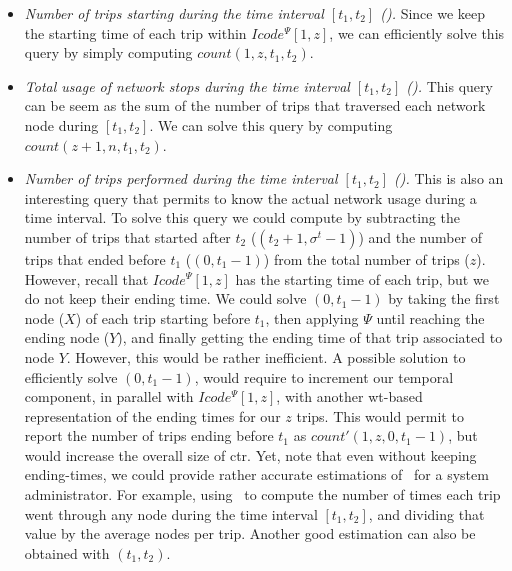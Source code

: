 	\begin{itemize}[leftmargin=3mm]
	\setlength{\itemindent}{0mm}


	\item {\em Number of trips starting during the time interval $[t_1,t_2]$ (\Tst).} Since we keep the
	starting time of each trip within $Icode^{\Psi}[1,z]$, we can efficiently solve this query 
	by simply computing $count(1,z,t_1,t_2)$.

	\item  {\em Total usage of network stops during the time interval $[t_1,t_2]$ (\Tut).} This query
	can be seem as the sum of the number of trips that traversed each network node during $[t_1,t_2]$.
	We can solve this query by computing $count(z+1,n,t_1,t_2)$. 

	\item {\em Number of trips performed during the time interval $[t_1,t_2]$ (\Ttt).} This is also an
	interesting query that permits to know the actual network usage during a time interval. 
	To solve this query
	we could compute {\em \Ttt} by subtracting the number of trips that started after $t_2$ 
	(\textit{\Tst}$(t_2+1,\sigma^t-1) $) and the number of trips that ended 
	before $t_1$ (\textit{\Tet}$(0,t_1-1) $) from the total number of trips ($z$). 
	However, recall that
	$Icode^{\Psi}[1,z]$ has the starting time of each trip, but we do not keep their ending time.
	We could solve \textit{\Tet}$(0,t_1-1)$ by taking the first node ($X$) of each trip starting
	before $t_1$, then applying $\Psi$ until reaching the ending node ($Y$), and finally getting the ending
	time of that trip associated to node $Y$. However, this would be rather inefficient.
	A possible solution to efficiently solve \textit{\Tet}$(0,t_1-1)$, would require to increment our temporal
	component, in parallel with $Icode^{\Psi}[1,z]$,  with another \gls{wt}-based representation of the 
	ending times for our $z$ trips. This would permit to report the number of trips
	ending before $t_1$ as $count'(1,z,0,t_1-1)$, but would increase the overall size of \gls{ctr}.
	Yet, note that even without keeping ending-times, we could 
	provide rather accurate estimations of \Ttt\ for a system administrator. For example, using \Tut\
	to compute the number of times each trip went through any node during the time interval $[t_1,t_2]$, 
	and dividing that value by the average nodes per trip. Another good estimation can also be obtained with 
	{\em\Tst$(t_1,t_2)$}.



\end{itemize}
